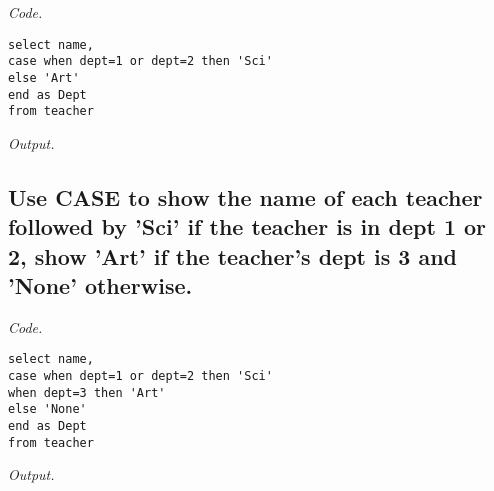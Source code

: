 \documentclass[12pt]{article}
\begin{document}
\textit{Code.}

\begin{lstlisting}[showstringspaces=false]
select name,
case when dept=1 or dept=2 then 'Sci'
else 'Art'
end as Dept
from teacher
\end{lstlisting}

\textit{Output.}\\

\subsection{Use CASE to show the name of each teacher followed by 'Sci' if the teacher is in dept 1 or 2, show 'Art' if the teacher's dept is 3 and 'None' otherwise.}

\textit{Code.}

\begin{lstlisting}[showstringspaces=false]
select name,
case when dept=1 or dept=2 then 'Sci'
when dept=3 then 'Art'
else 'None'
end as Dept
from teacher
\end{lstlisting}

\textit{Output.}\\
\end{document}
